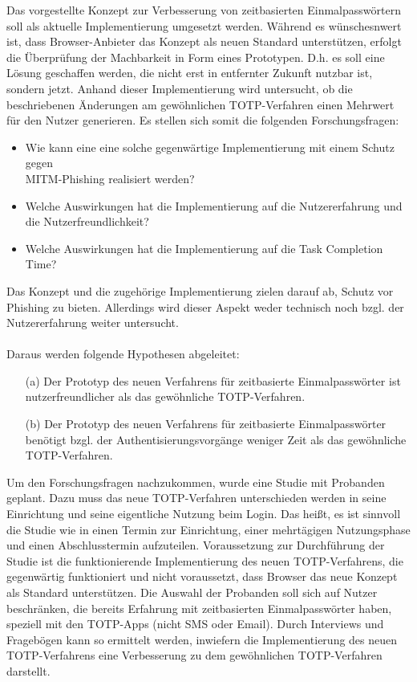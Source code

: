 Das vorgestellte Konzept zur Verbesserung von zeitbasierten Einmalpasswörtern 
soll als aktuelle Implementierung umgesetzt werden. Während es wünschesnwert ist, dass Browser-Anbieter das Konzept als neuen Standard unterstützen, erfolgt die Überprüfung der Machbarkeit in Form eines Prototypen. 
D.h. es soll eine Lösung geschaffen werden, die nicht erst in entfernter Zukunft 
nutzbar ist, sondern jetzt.
Anhand dieser Implementierung wird untersucht, ob die beschriebenen Änderungen am 
gewöhnlichen \mbox{TOTP-Verfahren} einen Mehrwert für den Nutzer generieren. Es stellen sich somit die folgenden Forschungsfragen:
\begin{itemize}
    \item Wie kann eine eine solche gegenwärtige Implementierung mit einem Schutz gegen \\MITM-Phishing realisiert werden?
    \item Welche Auswirkungen hat die Implementierung auf die Nutzererfahrung und die Nutzerfreundlichkeit?
    \item Welche Auswirkungen hat die Implementierung auf die Task Completion Time?
\end{itemize}
Das Konzept und die zugehörige Implementierung zielen darauf ab, Schutz vor Phishing zu bieten. Allerdings wird dieser Aspekt weder technisch noch bzgl. der Nutzererfahrung weiter untersucht.
\\\\
Daraus werden folgende Hypothesen abgeleitet:
\begin{itemize}
    \item[(a)] Der Prototyp des neuen Verfahrens für zeitbasierte Einmalpasswörter ist nutzerfreundlicher als das gewöhnliche TOTP-Verfahren.
    \item[(b)]  Der Prototyp des neuen Verfahrens für zeitbasierte Einmalpasswörter benötigt bzgl. der Authentisierungsvorgänge weniger Zeit als das gewöhnliche TOTP-Verfahren.
\end{itemize}
Um den Forschungsfragen nachzukommen, wurde eine Studie mit Probanden geplant. 
Dazu muss das neue TOTP-Verfahren unterschieden werden in seine Einrichtung und 
seine eigentliche Nutzung beim Login. Das heißt, es ist sinnvoll die Studie wie \textcite{Reese} in einen Termin zur Einrichtung, einer mehrtägigen Nutzungsphase und einen Abschlusstermin aufzuteilen. Voraussetzung zur Durchführung der Studie ist die funktionierende Implementierung 
des neuen TOTP-Verfahrens, die gegenwärtig funktioniert und nicht voraussetzt, dass Browser das neue Konzept als Standard unterstützen.
Die Auswahl der Probanden soll sich auf Nutzer beschränken, die bereits Erfahrung 
mit zeitbasierten Einmalpasswörter haben, speziell mit den TOTP-Apps (nicht SMS 
oder Email). Durch Interviews und Fragebögen kann so ermittelt werden, inwiefern 
die Implementierung des neuen TOTP-Verfahrens eine Verbesserung zu dem 
gewöhnlichen TOTP-Verfahren darstellt.

